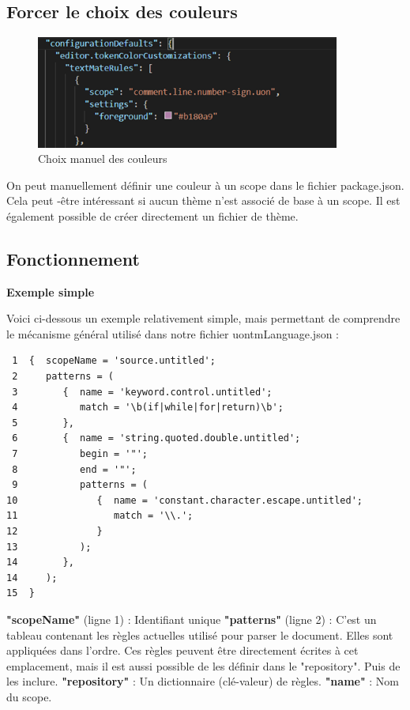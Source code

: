 \documentclass[
    iict, %
    il, %
]{heig-tb}
\begin{document}
\subsection{Forcer le choix des couleurs}
\begin{figure}[!ht]
    \begin{center}
        \includegraphics[width=10cm]{assets/figures/manual-settings-color.png}
    \end{center}
    \caption[Choix manuel des couleurs]{\label{manual-settings-color} Choix manuel des couleurs}
\end{figure}

On peut manuellement définir une couleur à un scope dans le fichier package.json.
Cela peut -être intéressant si aucun thème n’est associé de base à un scope.
Il est également possible de créer directement un fichier de thème.

\subsection{Fonctionnement}
\textbf{Exemple simple}

Voici ci-dessous un exemple relativement simple, mais permettant de comprendre le mécanisme général utilisé dans notre fichier uontmLanguage.json :
\begin{lstlisting}
 1  {  scopeName = 'source.untitled';
 2     patterns = (
 3        {  name = 'keyword.control.untitled';
 4           match = '\b(if|while|for|return)\b';
 5        },
 6        {  name = 'string.quoted.double.untitled';
 7           begin = '"';
 8           end = '"';
 9           patterns = (
10              {  name = 'constant.character.escape.untitled';
11                 match = '\\.';
12              }
13           );
14        },
14     );
15  }
\end{lstlisting}

\textbf{"scopeName"} (ligne 1) : Identifiant unique
\textbf{"patterns"} (ligne 2) : C’est un tableau contenant les règles actuelles utilisé pour parser le document. Elles sont appliquées dans l’ordre.
Ces règles peuvent être directement écrites à cet emplacement, mais il est aussi possible de les définir dans le "repository". Puis de les inclure.
\textbf{"repository"} : Un dictionnaire (clé-valeur) de règles.
\textbf{"name"} : Nom du scope.
\end{document}
